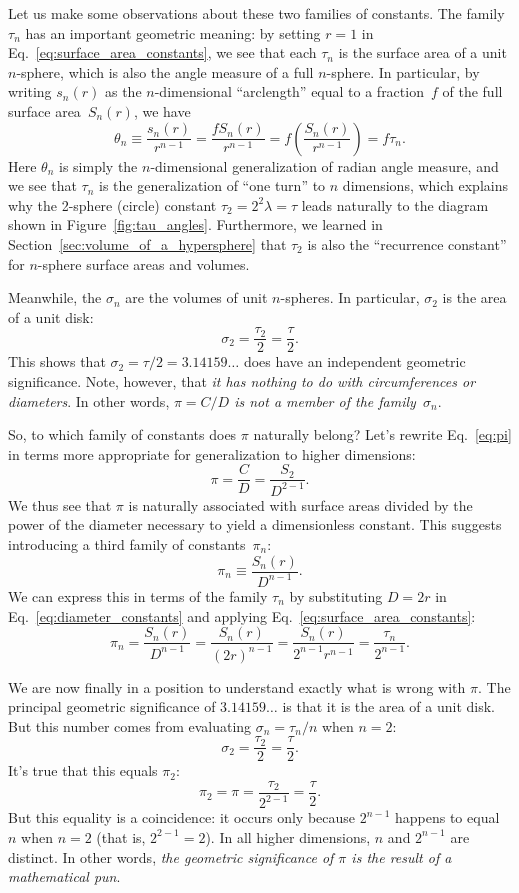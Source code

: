 Let us make some observations about these two families of constants. The family $\tau_n$ has an important geometric meaning: by setting $r=1$ in Eq.~\eqref{eq:surface_area_constants}, we see that each $\tau_n$ is the surface area of a unit $n$-sphere, which is also the angle measure of a full $n$-sphere. In particular, by writing $s_n(r)$ as the $n$-dimensional ``arclength'' equal to a fraction~$f$ of the full surface area~$S_n(r)$, we have
\[
\theta_n \equiv \frac{s_n(r)}{r^{n-1}} = \frac{f S_n(r)}{r^{n-1}} = f\left(\frac{S_n(r)}{r^{n-1}}\right) = f\tau_n.
\]
Here $\theta_n$ is simply the $n$-dimensional generalization of radian angle measure, and we see that $\tau_n$ is the generalization of ``one turn'' to $n$ dimensions, which explains why the 2-sphere (circle) constant $\tau_2 = 2^2\lambda = \tau$ leads naturally to the diagram shown in Figure~\ref{fig:tau_angles}. Furthermore, we learned in Section~\ref{sec:volume_of_a_hypersphere} that $\tau_2$ is also the ``recurrence constant'' for $n$-sphere surface areas and volumes.

Meanwhile, the $\sigma_n$ are the volumes of unit $n$-spheres. In particular, $\sigma_2$ is the area of a unit disk:
\[
\sigma_2 = \frac{\tau_2}{2} = \frac{\tau}{2}.
\]
This shows that $\sigma_2 = \tau/2 = 3.14159\ldots$ does have an independent geometric significance. Note, however, that \emph{it has nothing to do with circumferences or diameters}. In other words, \emph{$\pi = C/D$ is not a member of the family~$\sigma_n$}.

So, to which family of constants does $\pi$ naturally belong?
Let's rewrite Eq.~\eqref{eq:pi} in terms more appropriate for generalization to higher dimensions:
\[
\pi = \frac{C}{D} = \frac{S_2}{D^{2-1}}.
\]
We thus see that $\pi$ is naturally associated with surface areas divided by the power of the diameter necessary to yield a dimensionless constant. This suggests introducing a third family of constants~$\pi_n$:
\begin{equation}
\label{eq:diameter_constants}
\pi_n \equiv \frac{S_n(r)}{D^{n-1}}.
\end{equation}
We can express this in terms of the family $\tau_n$ by substituting $D = 2r$ in Eq.~\eqref{eq:diameter_constants} and applying Eq.~\eqref{eq:surface_area_constants}:
\[
\pi_n = \frac{S_n(r)}{D^{n-1}} = \frac{S_n(r)}{(2r)^{n-1}} =
\frac{S_n(r)}{2^{n-1}r^{n-1}} = \frac{\tau_n}{2^{n-1}}.
\]

We are now finally in a position to understand exactly what is wrong with $\pi$. The principal geometric significance of $3.14159\ldots$ is that it is the area of a unit disk. But this number comes from evaluating $\sigma_n = \tau_n/n$ when $n=2$:
\[
\sigma_2 = \frac{\tau_2}{2} = \frac{\tau}{2}.
\]
It's true that this equals $\pi_2$:
\[
\pi_2 = \pi = \frac{\tau_2}{2^{2-1}} = \frac{\tau}{2}.
\]
But this equality is a coincidence: it occurs only because $2^{n-1}$ happens to equal $n$ when $n=2$ (that is, $2^{2-1} = 2$). In all higher dimensions, $n$ and $2^{n-1}$ are distinct. In other words, \emph{the geometric significance of $\pi$ is the result of a mathematical pun}.

